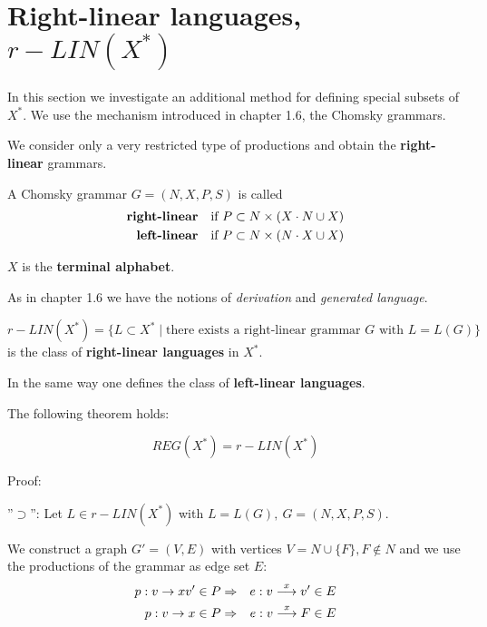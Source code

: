 \section{Right-linear languages, $r{-}LIN(X^*)$}

In this section we investigate an additional method for defining special subsets
of $X^*$. We use the mechanism introduced in chapter 1.6, the Chomsky grammars.

We consider only a very restricted type of productions and obtain the {\bf
right-linear} grammars.

\begin{definition}
A Chomsky grammar $G = (N, X, P, S)$ is called
\begin{eqnarray*}
\mbox{\bf right-linear} & & \mbox{if } P \subset N \times (X \cdot N \cup X) \\
\mbox{\bf left-linear}  & & \mbox{if } P \subset N \times (N \cdot X \cup X)
\end{eqnarray*}
\end{definition}

$X$ is the {\bf terminal alphabet}.

As in chapter 1.6 we have the notions of {\em derivation} and {\em generated
language}.

\begin{definition}
\[ r{-}LIN(X^*) = \{ L \subset X^* \mid \mbox{there exists a right-linear
grammar $G$ with } L = L(G) \} \]
is the class of {\bf right-linear languages} in $X^*$.
\end{definition}

In the same way one defines the class of {\bf left-linear languages}.

The following theorem holds:

\begin{theorem}
\[ REG(X^*) = r{-}LIN(X^*) \]
\end{theorem}

Proof:

''$\supset$'': Let $L \in r{-}LIN(X^*)$ with $L = L(G),\ G = (N, X, P, S)$.

We construct a graph $G' = (V, E)$ with vertices $V = N \cup \{F\}, F \notin N$
and we use the productions of the grammar as edge set $E$:
\begin{eqnarray*}
p: v \to x v' \in P & \Rightarrow & e:  v \stackrel{x}{\longrightarrow} v' \in E \\
p: v \to x \in P & \Rightarrow & e : v \stackrel{x}{\longrightarrow} F \in E
\end{eqnarray*} 

